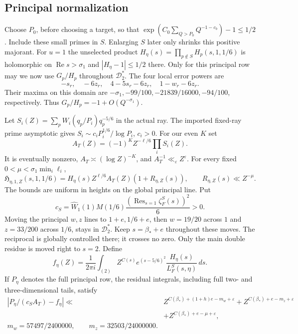 \documentclass[11pt,a4paper]{article}
\theoremstyle{definition}
\newcommand{\Rea}{\operatorname{Re}}
\newcommand{\eps}{\varepsilon}
\newcommand{\sig}{\sigma_1}
\newcommand{\bet}{\beta_*}
\newcommand{\HH}{\mathfrak H}
\newcommand{\LL}{L_F^S}
\begin{document}
\subsection{Principal normalization}
Choose $P_0$, before choosing a target, so that
$\exp(C_0\sum_{Q>P_0}Q^{-1-c_b})-1\le1/2$.
Include these small primes in $S$. Enlarging $S$ later only shrinks
this positive majorant. For $u=1$ the unselected product
$H_\eta(s)=\prod_{p\notin S}H_p(s,1,1/6)$ is holomorphic on
$\Rea s>\sig$ and $|H_\eta-1|\le1/2$ there.
Only for this principal row may we now use $G_p/H_p$ throughout
$\mathcal D_2^*$. The four local error powers are
\[
 -s_r,\quad-6z_r,\quad4-5s_r-6z_r,\quad1-w_r-6z_r.
\]
Their maxima on this domain are
$-\sig,-99/100,-21839/16000,-94/100$, respectively. Thus
$G_p/H_p=-1+O(Q^{-\sig})$.

Let $S_i(Z)=\sum_p W_i(q_p/P_i)q_p^{-5/6}$ in the actual ray.
The imported fixed-ray prime asymptotic gives
$S_i\sim c_iP_i^{1/6}/\log P_i$, $c_i>0$.
For our even $K$ set
\[
 A_T(Z)=(-1)^K Z^{-\ell/6}\prod_i S_i(Z).
\]
It is eventually nonzero, $A_T\asymp(\log Z)^{-K}$,
and $A_T^{-1}\ll_\eps Z^\eps$.
For every fixed $0<\mu<\sig\min_i\ell_i$,
\begin{equation}\label{eq:principalfactor}
 \HH_{\eta,1,Z}(s,1,1/6)
 =H_\eta(s)Z^{\ell/6}A_T(Z)(1+R_{\eta,Z}(s)),
 \qquad R_{\eta,Z}(s)\ll Z^{-\mu}.
\end{equation}
The bounds are uniform in heights on the global principal line.
Put
\[
 c_S=\widehat W_1(1)M(1/6)
       \frac{(\operatorname{Res}_{s=1}\zeta_F^S(s))^2}{6}>0.
\]
Moving the principal $w,z$ lines to $1+e,1/6+e$, then
$w=19/20$ across $1$ and $z=33/200$ across $1/6$, stays in
$\mathcal D_2^*$. Keep $s=\bet+e$ throughout these moves.
The reciprocal is globally controlled there; it crosses no zero.
Only the main double residue is moved right to $s=2$.
Define
\begin{equation}\label{eq:f}
 f_\eta(Z)=\frac1{2\pi i}\int_{(2)}
 Z^{C(s)}e^{(s-5/6)^2}\frac{H_\eta(s)}{\LL(s,\eta)}\,ds.
\end{equation}
If $P_\eta$ denotes the full principal row, the residual integrals,
including full two- and three-dimensional tails, satisfy
\begin{equation}\label{eq:principalerrors}
\begin{split}
 \left|P_\eta/(c_S A_T)-f_\eta\right|\ll {}&
 Z^{C(\bet)+(1+h)e-m_w+\eps}
 +Z^{C(\bet)+e-m_z+\eps}\\
 &+Z^{C(\bet)+e-\mu+\eps},\\
 m_w={57497}/{2400000},\qquad
 m_z={32503}/{24000000}.
\end{split}
\end{equation}
\end{document}

